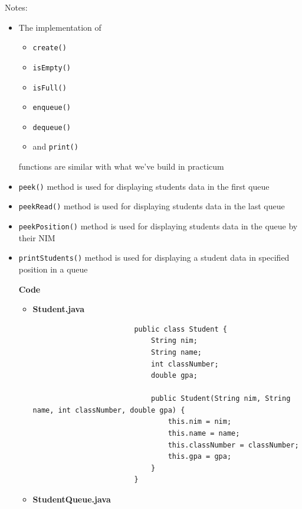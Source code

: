 \documentclass[12pt,titlepage]{article}
\begin{document}
\begin{enumerate}
{        Notes:
        \begin{itemize}
            \item {
                The implementation of 
                \begin{itemize}
                    \item \texttt{create()}
                    \item \texttt{isEmpty()} 
                    \item \texttt{isFull()}
                    \item \texttt{enqueue()}
                    \item \texttt{dequeue()}
                    \item and \texttt{print()}
                \end{itemize}
                functions are similar with what we've build in practicum
            }
            \item {
                \texttt{peek()} method is used for displaying students data in the first queue
            }
            \item {
                \texttt{peekRead()} method is used for displaying students data in the last queue
            }
            \item {
                \texttt{peekPosition()} method is used for displaying students data in the queue by their NIM
            }
            \item {
                \texttt{printStudents()} method is used for displaying a student data in specified position in a queue
            }

            \pagebreak

            \large{\textbf{Code}}
            \begin{itemize}
                \item {
                    \textbf{Student.java}

                    \begin{verbatim}
                        public class Student {
                            String nim;
                            String name;
                            int classNumber;
                            double gpa;

                            public Student(String nim, String name, int classNumber, double gpa) {
                                this.nim = nim;
                                this.name = name;
                                this.classNumber = classNumber;
                                this.gpa = gpa;
                            }
                        }
                    \end{verbatim}
                }
                \item {
                    \textbf{StudentQueue.java}

}
\end{itemize}
\end{itemize}}
\end{enumerate}
\end{document}
